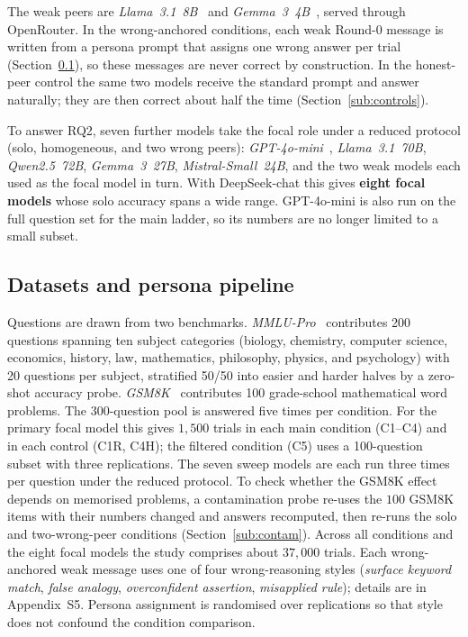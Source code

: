 \documentclass[11pt]{article}
\begin{document}
The weak peers are \textit{Llama~3.1~8B}~\citep{meta2024llama3} and
\textit{Gemma~3~4B}~\citep{gemma2025technical}, served through OpenRouter.
In the wrong-anchored conditions, each weak Round-0 message is written from
a persona prompt that assigns one wrong answer per trial
(Section~\ref{sub:data}), so these messages are never correct by
construction.
In the honest-peer control the same two models receive the standard prompt
and answer naturally; they are then correct about half the time
(Section~\ref{sub:controls}).

To answer RQ2, seven further models take the focal role under a reduced
protocol (solo, homogeneous, and two wrong peers):
\textit{GPT-4o-mini}~\citep{openai2024gpt4o}, \textit{Llama~3.1~70B},
\textit{Qwen2.5~72B}, \textit{Gemma~3~27B}, \textit{Mistral-Small~24B},
and the two weak models each used as the focal model in turn.
With DeepSeek-chat this gives \textbf{eight focal models} whose solo
accuracy spans a wide range.
GPT-4o-mini is also run on the full question set for the main ladder, so
its numbers are no longer limited to a small subset.

\subsection{Datasets and persona pipeline}
\label{sub:data}

Questions are drawn from two benchmarks.
\textit{MMLU-Pro}~\citep{wang2024mmlupro} contributes 200 questions spanning
ten subject categories (biology, chemistry, computer science, economics,
history, law, mathematics, philosophy, physics, and psychology) with
20 questions per subject, stratified 50/50 into easier and harder halves by
a zero-shot accuracy probe.
\textit{GSM8K}~\citep{cobbe2021training} contributes 100 grade-school
mathematical word problems.
The 300-question pool is answered five times per condition.
For the primary focal model this gives $1{,}500$ trials in each main
condition (C1--C4) and in each control (C1R, C4H); the filtered condition
(C5) uses a 100-question subset with three replications.
The seven sweep models are each run three times per question under the
reduced protocol.
To check whether the GSM8K effect depends on memorised problems, a
contamination probe re-uses the $100$ GSM8K items with their numbers
changed and answers recomputed, then re-runs the solo and two-wrong-peer
conditions (Section~\ref{sub:contam}).
Across all conditions and the eight focal models the study comprises about
$37{,}000$ trials.
Each wrong-anchored weak message uses one of four wrong-reasoning styles
(\textit{surface keyword match}, \textit{false analogy},
\textit{overconfident assertion}, \textit{misapplied rule}); details are in
Appendix~S5.
Persona assignment is randomised over replications so that style does not
confound the condition comparison.
\end{document}
